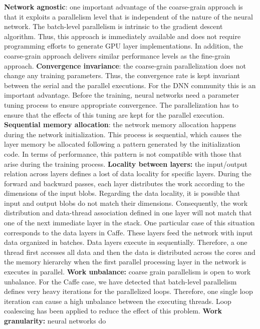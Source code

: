 \textbf{Network agnostic}: one important advantage of the coarse-grain 
approach is that it exploits a parallelism level that is independent of 
the nature of the neural network. The batch-level parallelism is 
intrinsic to the gradient descent algorithm. Thus, this approach is 
immediately available and does not require programming efforts to generate 
GPU layer implementations. In addition, the coarse-grain approach 
delivers similar performance levels as the fine-grain approach. 
\textbf{Convergence invariance}: the coarse-grain parallelization does not 
change any training parameters. Thus, the convergence rate is kept 
invariant between the serial and the parallel executions. 
For the DNN community this is an important advantage. Before 
the training, neural networks need a parameter tuning process to ensure 
appropriate convergence. The parallelization has to ensure that the effects of this tuning are kept for the parallel execution.
\textbf{Sequential memory allocation}: the network memory allocation
happens during the network initialization. This process is sequential, 
which causes the layer memory be allocated following a
pattern generated by the initialization code. In terms of performance, 
this pattern is not compatible with those that arise during
the training process.
\textbf{Locality between layers:} the input/output relation across layers
defines a lost of data locality for specific layers. During the forward 
and backward passes, each layer distributes the work according to the 
dimensions of the input blobs. Regarding the data locality, it is 
possible that input and output blobs do not match
their dimensions. Consequently, the work distribution and data-thread
association defined in one layer will not match that one of the
next immediate layer in the stack.
One particular case of this situation corresponds to the data
layers in Caffe. These layers feed the network with input data
organized in batches. Data layers execute in sequentially.
Therefore, a one thread first accesses all data and then the data is
distributed across the cores and the memory hierarchy when the
first parallel processing layer in the network is executes in parallel. 
\textbf{Work unbalance:} coarse grain parallelism is open to work unbalance. 
For the Caffe case, we have detected that batch-level parallelism 
defines very heavy iterations for the parallelized loops.
Therefore, one single loop iteration can cause a high unbalance
between the executing threads. Loop coalescing has been applied to reduce the effect of this problem.
\textbf{Work granularity:} neural networks do

